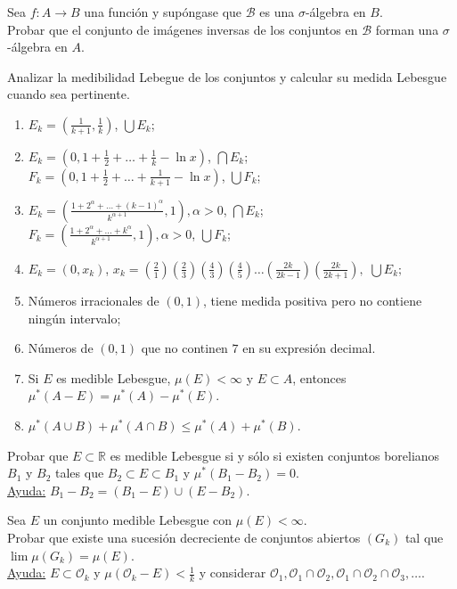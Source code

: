 \documentclass{book}
\newcommand{\rr}{\mathbb{R}}
\begin{document}
\begin{ejer}{} 
Sea $f: A\to B$ una funci\'on  y sup\'ongase que $\mathcal{B}$ es una $\sigma$-\'algebra en $B$. \\
Probar que el conjunto de im\'agenes inversas de los conjuntos en $\mathcal{B}$  forman una 
$\sigma$-\'algebra en $A$. 
\end{ejer}
 
\begin{ejer}{}
Analizar la medibilidad Lebegue de los conjuntos y calcular su medida Lebesgue cuando sea pertinente.

\begin{enumerate}
\item $E_k=\left(\frac{1}{k+1},\frac{1}{k}\right)$, $\bigcup E_k$;
\item $E_k=\left(0,1+\frac{1}{2}+\dots+\frac{1}{k}-\ln x\right)$, $\bigcap E_k$; \\
$F_k=\left(0,1+\frac{1}{2}+\dots+\frac{1}{k+1}-\ln x\right)$, $\bigcup F_k$; 
\item $E_k=\left(\frac{1+2^{\alpha}+\dots+(k-1)^{\alpha}}{k^{\alpha + 1}},1\right), \alpha>0$, $\bigcap E_k$;\\
$F_k=\left(\frac{1+2^{\alpha}+\dots+k^{\alpha}}{k^{\alpha + 1}},1\right), \alpha>0$, $\bigcup F_k$;
\item $E_k=(0,x_k)$, $x_k=(\frac{2}{1})(\frac{2}{3})(\frac{4}{3})(\frac{4}{5})\dots(\frac{2k}{2k-1})(\frac{2k}{2k+1}),$
$\bigcup E_k;$
\item N\'umeros irracionales de $(0,1)$, tiene medida positiva pero no contiene ning\'un intervalo;
\item N\'umeros de $(0,1)$ que no continen $7$ en su expresi\'on decimal.
\item Si $E$ es medible Lebesgue, $\mu(E)<\infty$ y $E\subset A$, entonces $\mu^*(A-E)=\mu^*(A)-\mu^*(E)$.
\item $\mu^*(A \cup B)+\mu^*(A\cap B) \leq \mu^*(A)+\mu^*(B)$.
\end{enumerate}
\end{ejer} 


\begin{ejer}{}
Probar que $E\subset \rr$ es medible Lebesgue si y s\'olo si existen conjuntos borelianos $B_1$
 y $B_2$ tales que $B_2\subset E\subset B_1$ y $\mu^*(B_1-B_2)=0$.
\\
\underline{Ayuda:} $B_1-B_2=(B_1-E)\cup (E-B_2)$. 
\end{ejer} 


\begin{ejer}{} 
 Sea $E$ un conjunto medible Lebesgue con $\mu(E)<\infty$.
\\Probar que existe una sucesi\'on decreciente de conjuntos abiertos $(G_k)$ tal que
$\lim \mu(G_k)=\mu (E)$.
\\
\underline{Ayuda:} $E\subset \mathcal{O}_k$ y $\mu(\mathcal{O}_k-E)<\frac{1}{k}$
y considerar 
$\mathcal{O}_1,\mathcal{O}_1\cap\mathcal{O}_2,\mathcal{O}_1\cap\mathcal{O}_2\cap\mathcal{O}_3,\dots$.
\end{ejer} 
\end{document}
